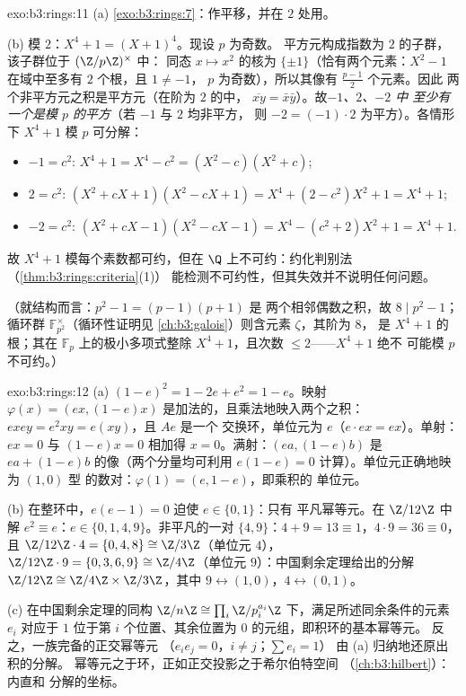 \begin{solution}{exo:b3:rings:11}
(a) \cref{exo:b3:rings:7}：作平移，并在 $2$ 处用。

(b) 模 $2$：$X^4 + 1 = (X + 1)^4$。现设 $p$ 为奇数。
平方元构成指数为 $2$ 的子群，该子群位于 $(\Z/p\Z)^\times$ 中：
同态 $x \mapsto x^2$ 的核为 $\{\pm 1\}$（恰有两个元素：$X^2
- 1$ 在域中至多有 $2$ 个根，且 $1 \neq -1$，
$p$ 为奇数），所以其像有 $\frac{p-1}2$ 个元素。因此
两个非平方元之积是平方元（在阶为 $2$ 的中，
$\overline{xy} = \bar x\bar y$）。故\emph{$-1$、$2$、$-2$ 中
至少有一个是模 $p$ 的平方}（若 $-1$ 与 $2$ 均非平方，
则 $-2 = (-1)\cdot 2$ 为平方）。各情形下 $X^4 + 1$ 模 $p$ 可分解：
\begin{itemize}
  \item $-1 = c^2$: \quad $X^4 + 1 = X^4 - c^2 = (X^2 - c)(X^2 +
        c)$;
  \item $2 = c^2$: \quad $(X^2 + cX + 1)(X^2 - cX + 1) = X^4 + (2
        - c^2)X^2 + 1 = X^4 + 1$;
  \item $-2 = c^2$: \quad $(X^2 + cX - 1)(X^2 - cX - 1) = X^4 -
        (c^2 + 2)X^2 + 1 = X^4 + 1$.
\end{itemize}
故 $X^4+1$ 模每个素数都可约，但在
$\Q$ 上不可约：约化判别法（\cref{thm:b3:rings:criteria}(1)）
能检测不可约性，但其失效并不说明任何问题。

（就结构而言：$p^2 - 1 = (p-1)(p+1)$ 是
两个相邻偶数之积，故 $8 \mid p^2 - 1$；
循环群 $\mathbb F_{p^2}^\times$（循环性证明见
\cref{ch:b3:galois}）则含元素 $\zeta$，其阶为 $8$，
是 $X^4 + 1$ 的根；其在 $\mathbb
F_p$ 上的极小多项式整除 $X^4+1$，且次数 $\leq 2$——$X^4+1$ 绝不
可能模 $p$ 不可约。）
\end{solution}

\begin{solution}{exo:b3:rings:12}
(a) $(1-e)^2 = 1 - 2e + e^2 = 1 - e$。映射 $\varphi(x) =
(ex, (1-e)x)$ 是加法的，且乘法地映入两个之积：
$exey = e^2xy = e(xy)$，且 $Ae$ 是一个
交换环，单位元为 $e$（$e\cdot ex = ex$）。单射：
$ex = 0$ 与 $(1-e)x = 0$ 相加得 $x = 0$。满射：$(ea,
(1-e)b)$ 是 $ea + (1-e)b$ 的像（两个分量均可利用
$e(1-e) = 0$ 计算）。单位元正确地映为 $(1, 0)$ 型
的数对：$\varphi(1) = (e, 1-e)$，即乘积的
单位元。

(b) 在整环中，$e(e - 1) = 0$ 迫使 $e \in \{0, 1\}$：只有
平凡幂等元。在 $\Z/12\Z$ 中解 $e^2 \equiv e$：$e
\in \{0, 1, 4, 9\}$。非平凡的一对 $\{4, 9\}$：$4 + 9 =
13 \equiv 1$，$4\cdot9 = 36 \equiv 0$，且 $\Z/12\Z\cdot4 =
\{0, 4, 8\} \cong \Z/3\Z$（单位元 $4$），$\Z/12\Z\cdot9 = \{0,
3, 6, 9\} \cong \Z/4\Z$（单位元 $9$）：中国剩余定理给出的分解
$\Z/12\Z \cong \Z/4\Z\times\Z/3\Z$，其中 $9 \leftrightarrow
(1, 0)$，$4 \leftrightarrow (0, 1)$。

(c) 在中国剩余定理的同构 $\Z/n\Z \cong \prod_i
\Z/p_i^{a_i}\Z$ 下，满足所述同余条件的元素 $e_i$
对应于 $1$ 位于第 $i$ 个位置、其余位置为
$0$ 的元组，即积环的基本幂等元。
反之，一族完备的正交幂等元
（$e_ie_j = 0$，$i \neq j$；$\sum e_i = 1$）
由 (a) 归纳地还原出积的分解。
幂等元之于环，正如正交投影之于希尔伯特空间
（\cref{ch:b3:hilbert}）：内直和
分解的坐标。
\end{solution}

